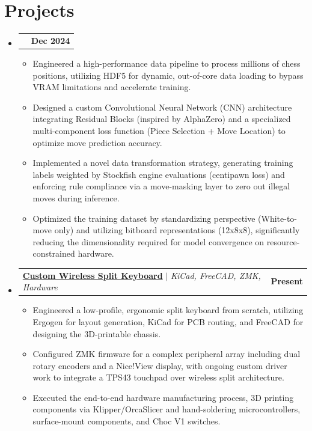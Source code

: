 \documentclass[letterpaper,11pt]{article}
\makeatletter
\newcommand{\resumeItem}[1]{
  \item\small{
    {#1 \vspace{-2pt}}
  }
}
\newcommand{\resumeProjectHeading}[2]{
    \item
    \begin{tabular*}{1.001\textwidth}{l@{\extracolsep{\fill}}r}
      \small#1 & \textbf{\small #2}\\
    \end{tabular*}\vspace{-7pt}
}
\newcommand{\resumeSubHeadingListStart}{\begin{itemize}[leftmargin=0.0in, label={}]}
\newcommand{\resumeSubHeadingListEnd}{\end{itemize}}
\newcommand{\resumeItemListStart}{\begin{itemize}}
\newcommand{\resumeItemListEnd}{\end{itemize}\vspace{-5pt}}
\makeatother
\begin{document}
\section{Projects}
    \vspace{-5pt}
    \resumeSubHeadingListStart
      \resumeProjectHeading
          {\textbf{\underline{Chess Convolutional Neural Network}~\href{https://github.com/jacobghunter/chess-ai/tree/main/cnn}} $|$ \emph{PyTorch}}{Dec 2024}
          \resumeItemListStart
            \resumeItem{Engineered a high-performance data pipeline to process millions of chess positions, utilizing HDF5 for dynamic, out-of-core data loading to bypass VRAM limitations and accelerate training.}
            \resumeItem{Designed a custom Convolutional Neural Network (CNN) architecture integrating Residual Blocks (inspired by AlphaZero) and a specialized multi-component loss function (Piece Selection + Move Location) to optimize move prediction accuracy.}
            \resumeItem{Implemented a novel data transformation strategy, generating training labels weighted by Stockfish engine evaluations (centipawn loss) and enforcing rule compliance via a move-masking layer to zero out illegal moves during inference.}
            \resumeItem{Optimized the training dataset by standardizing perspective (White-to-move only) and utilizing bitboard representations (12x8x8), significantly reducing the dimensionality required for model convergence on resource-constrained hardware.}
          \resumeItemListEnd 
          \vspace{-13pt}
        \resumeProjectHeading
          {\textbf{\underline{Custom Wireless Split Keyboard}} $|$ \emph{KiCad, FreeCAD, ZMK, Hardware}}{Present}
          \resumeItemListStart
            \resumeItem{Engineered a low-profile, ergonomic split keyboard from scratch, utilizing Ergogen for layout generation, KiCad for PCB routing, and FreeCAD for designing the 3D-printable chassis.}
            \resumeItem{Configured ZMK firmware for a complex peripheral array including dual rotary encoders and a Nice!View display, with ongoing custom driver work to integrate a TPS43 touchpad over wireless split architecture.}
            \resumeItem{Executed the end-to-end hardware manufacturing process, 3D printing components via Klipper/OrcaSlicer and hand-soldering microcontrollers, surface-mount components, and Choc V1 switches.}
          \resumeItemListEnd
          \vspace{-13pt}
    \resumeSubHeadingListEnd
\vspace{-2pt}
\end{document}
